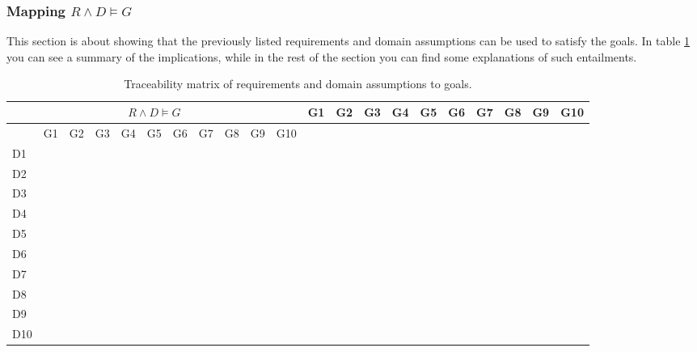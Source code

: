 \documentclass{article}
\begin{document}
\subsubsection{Mapping \texorpdfstring{$R \wedge D \vDash G$}{TEXT}}
This section is about showing that the previously listed requirements and domain assumptions can be used to satisfy the goals. In table \ref{rg mapping} you can see a summary of the implications, while in the rest of the section you can find some explanations of such entailments.

\begin{longtable}[c]{|m{0.15cm}|m{0.15cm}|m{0.15cm}|m{0.15cm}|m{0.15cm}|m{0.15cm}|m{0.15cm}|m{0.15cm}|m{0.15cm}|m{0.15cm}|m{0.15cm}|}
 \caption{Traceability matrix of requirements and domain assumptions to goals.}
 \label{rg mapping}
 \hline
 \multicolumn{11}{|c|}{\cellcolor{white}$R \wedge D \vDash G$}
 \endfirsthead
 \hline
  \cellcolor{yellow!30} & \cellcolor{white}G1 & \cellcolor{white}G2 & \cellcolor{white}G3 & \cellcolor{white}G4 & \cellcolor{white}G5 & \cellcolor{white}G6 & \cellcolor{white}G7 & \cellcolor{white}G8 & \cellcolor{white}G9 & \cellcolor{white}G10 \\
 \endhead
 \endfoot
 \endlastfoot
 \hline
  \cellcolor{yellow!30} & \cellcolor{white}G1 & \cellcolor{white}G2 & \cellcolor{white}G3 & \cellcolor{white}G4 & \cellcolor{white}G5 & \cellcolor{white}G6 & \cellcolor{white}G7 & \cellcolor{white}G8 & \cellcolor{white}G9 & \cellcolor{white}G10 \\
 \hline
 D1 &   &   &   &   &   &   &   &   &   &   \\
 \hline
 D2 &   &   &   &   &   &   &   &   &   &   \\
 \hline
 D3 &   &   &   &   &   &   &   &   &   &   \\
 \hline
 D4 &   &   &   &   &   &   &   &   &   &   \\
 \hline
 D5 &   &   &   &   &   &   &   &   &   &   \\
 \hline
 D6 &   &   &   &   &   &   &   &   &   &   \\
 \hline
 D7 &   &   &   &   &   &   &   &   &   &   \\
 \hline
 D8 &   &   &   &   &   &   &   &   &   &   \\
 \hline
 D9 &   &   &   &   &   &   &   &   &   &   \\
 \hline
 D10 &   &   &   &   &   &   &   &   &   &   \\

\end{longtable}
\end{document}
